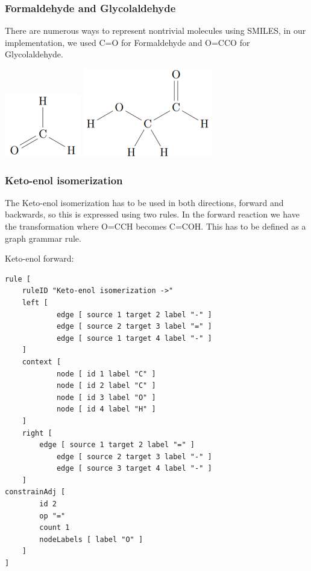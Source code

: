 \documentclass[a4paper,10pt,titlepage]{report}
\begin{document}
\subsubsection{Formaldehyde and Glycolaldehyde}

There are numerous ways to represent nontrivial molecules using SMILES, in our implementation, we used C=O for Formaldehyde and O=CCO for Glycolaldehyde.

    \vspace{10mm}
    \hspace{50mm}
	\includegraphics[scale=0.5]{fa}
	\hspace{15mm}
    \includegraphics[scale=0.5]{ga}
    \vspace{10mm}
    
\subsubsection{Keto-enol isomerization}
The Keto-enol isomerization has to be used in both directions, forward and backwards, so this is expressed using two rules. 
In the forward reaction we have the transformation where O=CCH becomes C=COH.
This has to be defined as a graph grammar rule. 

Keto-enol forward:
\begin{lstlisting}
rule [
	ruleID "Keto-enol isomerization ->"
	left [
            edge [ source 1 target 2 label "-" ]
            edge [ source 2 target 3 label "=" ]
            edge [ source 1 target 4 label "-" ]
	]
	context [
            node [ id 1 label "C" ]
            node [ id 2 label "C" ]
            node [ id 3 label "O" ]
            node [ id 4 label "H" ]
	]
	right [
	    edge [ source 1 target 2 label "=" ]
            edge [ source 2 target 3 label "-" ]
            edge [ source 3 target 4 label "-" ]
	]
constrainAdj [
	    id 2
	    op "="
	    count 1
	    nodeLabels [ label "O" ]
	]
] 
\end{lstlisting}
\end{document}
